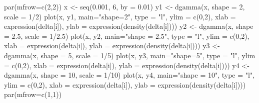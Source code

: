 \begin{Schunk}
\begin{Sinput}
 par(mfrow=c(2,2))
 x <- seq(0.001, 6, by = 0.01)
 y1 <- dgamma(x, shape = 2, scale = 1/2)
 plot(x, y1, main="shape=2", type = "l", ylim = c(0,2), 
       xlab = expression(delta[i]),
       ylab = expression(density(delta[i])))
 y2 <- dgamma(x, shape = 2.5, scale = 1/2.5)
 plot(x, y2, main="shape = 2.5", type = "l", ylim = c(0,2), 
       xlab = expression(delta[i]),
       ylab = expression(density(delta[i])))
 y3 <- dgamma(x, shape = 5, scale = 1/5)
 plot(x, y3, main="shape=5", type = "l", ylim = c(0,2), 
       xlab = expression(delta[i]),
       ylab = expression(density(delta[i])))
 y4 <- dgamma(x, shape = 10, scale = 1/10)
 plot(x, y4, main="shape = 10", type = "l", ylim = c(0,2), 
       xlab = expression(delta[i]),
       ylab = expression(density(delta[i])))
 par(mfrow=c(1,1))
\end{Sinput}
\end{Schunk}
